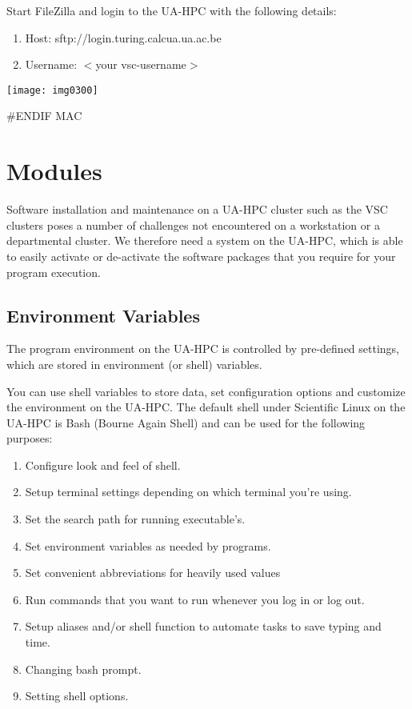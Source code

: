 Start FileZilla and login to the UA-HPC with the following details:

\begin{enumerate}
\item  Host: sftp://login.turing.calcua.ua.ac.be
\item  Username:  $<$your vsc-username$>$
\end{enumerate}


\texttt{[image: img0300]}

\#ENDIF MAC


\section{Modules}

Software installation and maintenance on a UA-HPC cluster such as the VSC clusters poses a number of challenges not encountered on a workstation or a departmental cluster. We therefore need a system on the UA-HPC, which is able to easily activate or de-activate the software packages that you require for your program execution.


\subsection{Environment Variables}

The program environment on the UA-HPC is controlled by pre-defined settings, which are stored in environment (or shell) variables.

You can use shell variables to store data, set configuration options and customize the environment on the UA-HPC. The default shell under Scientific Linux on the UA-HPC is Bash (Bourne Again Shell) and can be used for the following purposes:

\begin{enumerate}
\item  Configure look and feel of shell.
\item  Setup terminal settings depending on which terminal you're using.
\item  Set the search path for running executable's.
\item  Set environment variables as needed by programs.
\item  Set convenient abbreviations for heavily used values
\item  Run commands that you want to run whenever you log in or log out.
\item  Setup aliases and/or shell function to automate tasks to save typing and time.
\item  Changing bash prompt.
\item  Setting shell options.
\end{enumerate}


